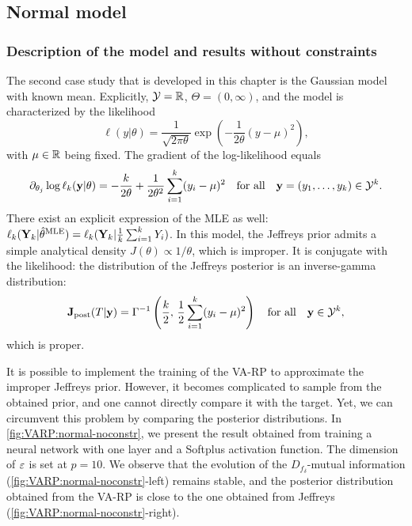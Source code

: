 \subsection{Normal model}


\subsubsection{Description of the model and results without constraints}

The second case study that is developed in this chapter is the Gaussian model with known mean. Explicitly, $\mathcal{Y}=\mathbb{R}$, $\Theta=(0,\infty)$, and the model is characterized by the likelihood 
\begin{equation}
    \ell(y|\theta) = \frac{1}{\sqrt{2\pi\theta}}\exp\left(-\frac{1}{2\theta}(y-\mu)^2\right),
\end{equation}
with $\mu\in\mathbb{R}$ being fixed. The gradient of the log-likelihood equals
\begin{equation}
    \partial_{\theta_j}\log\ell_k(\mathbf{y}|\theta) = -\frac{k}{2\theta}+\frac{1}{2\theta^2}\sum_{i=1}^k(y_i-\mu)^2\quad\text{for all}\quad \mathbf{y}=(y_1,\dots,y_k)\in\mathcal{Y}^k.
\end{equation}
There exist an explicit expression of the  MLE as well: $\ell_k(\mathbf{Y}_k|\hat\theta^{\text{MLE}})= \ell_k(\mathbf{Y}_k|\frac{1}{k}\sum_{i=1}^kY_i)$. In this model, the Jeffreys prior admits a simple analytical density $J(\theta)\propto1/\theta$, which is improper. 
It is conjugate with the likelihood: the distribution of the Jeffreys posterior is an inverse-gamma distribution:
    \begin{equation}
        \mathbf{J}_{\text{post}}(T|\mathbf{y}) = \Gamma^{-1}\left(\frac{k}{2},\,\frac{1}{2}\sum_{i=1}^{k}(y_i-\mu)^2\right)    \quad\text{for all}\quad \mathbf{y}\in\mathcal{Y}^k,
    \end{equation}
which is proper.

It is possible to implement the training of the VA-RP to approximate the improper Jeffreys prior. However, it becomes complicated to sample from the obtained prior, and one cannot directly compare it with the target. 
Yet, we can circumvent this problem by comparing the posterior distributions.
In \cref{fig:VARP:normal-noconstr}, we present the result obtained from training a neural network with one layer and a Softplus activation function. The dimension of $\varepsilon$ is set at $p=10$.
We observe that the evolution of the $D_{f_\delta}$-mutual information (\cref{fig:VARP:normal-noconstr}-left) remains stable, and the posterior distribution obtained from the VA-RP is close to the one obtained from Jeffreys (\cref{fig:VARP:normal-noconstr}-right).

